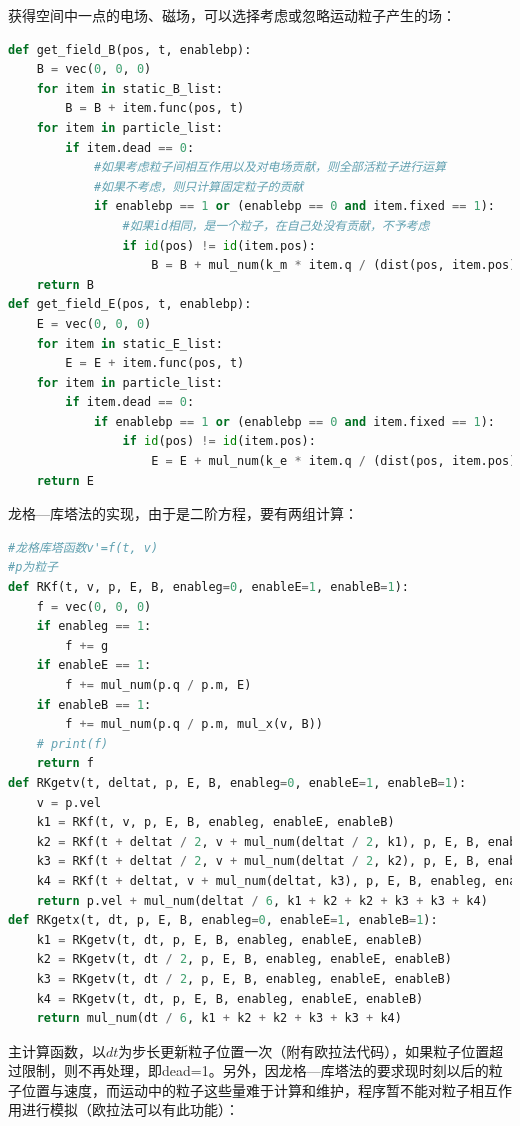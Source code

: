 \documentclass[UTF-8,cs4size]{ctexart}
\begin{document}
获得空间中一点的电场、磁场，可以选择考虑或忽略运动粒子产生的场：
\begin{lstlisting}[language=Python]
def get_field_B(pos, t, enablebp):
    B = vec(0, 0, 0)
    for item in static_B_list:
        B = B + item.func(pos, t)
    for item in particle_list:
        if item.dead == 0:
            #如果考虑粒子间相互作用以及对电场贡献，则全部活粒子进行运算
            #如果不考虑，则只计算固定粒子的贡献
            if enablebp == 1 or (enablebp == 0 and item.fixed == 1):
                #如果id相同，是一个粒子，在自己处没有贡献，不予考虑
                if id(pos) != id(item.pos):
                    B = B + mul_num(k_m * item.q / (dist(pos, item.pos) ** 3), mul_x(item.vel, (pos - item.pos)))
    return B
def get_field_E(pos, t, enablebp):
    E = vec(0, 0, 0)
    for item in static_E_list:
        E = E + item.func(pos, t)
    for item in particle_list:
        if item.dead == 0:
            if enablebp == 1 or (enablebp == 0 and item.fixed == 1):
                if id(pos) != id(item.pos):
                    E = E + mul_num(k_e * item.q / (dist(pos, item.pos) ** 3), pos - item.pos)
    return E
\end{lstlisting}
龙格—库塔法的实现，由于是二阶方程，要有两组计算：
\begin{lstlisting}[language=Python]
#龙格库塔函数v'=f(t, v)
#p为粒子
def RKf(t, v, p, E, B, enableg=0, enableE=1, enableB=1):
    f = vec(0, 0, 0)
    if enableg == 1:
        f += g
    if enableE == 1:
        f += mul_num(p.q / p.m, E)
    if enableB == 1:
        f += mul_num(p.q / p.m, mul_x(v, B))
    # print(f)
    return f
def RKgetv(t, deltat, p, E, B, enableg=0, enableE=1, enableB=1):
    v = p.vel
    k1 = RKf(t, v, p, E, B, enableg, enableE, enableB)
    k2 = RKf(t + deltat / 2, v + mul_num(deltat / 2, k1), p, E, B, enableg, enableE, enableB)
    k3 = RKf(t + deltat / 2, v + mul_num(deltat / 2, k2), p, E, B, enableg, enableE, enableB)
    k4 = RKf(t + deltat, v + mul_num(deltat, k3), p, E, B, enableg, enableE, enableB)
    return p.vel + mul_num(deltat / 6, k1 + k2 + k2 + k3 + k3 + k4)
def RKgetx(t, dt, p, E, B, enableg=0, enableE=1, enableB=1):
    k1 = RKgetv(t, dt, p, E, B, enableg, enableE, enableB)
    k2 = RKgetv(t, dt / 2, p, E, B, enableg, enableE, enableB)
    k3 = RKgetv(t, dt / 2, p, E, B, enableg, enableE, enableB)
    k4 = RKgetv(t, dt, p, E, B, enableg, enableE, enableB)
    return mul_num(dt / 6, k1 + k2 + k2 + k3 + k3 + k4)
\end{lstlisting}
主计算函数，以$dt$为步长更新粒子位置一次（附有欧拉法代码），如果粒子位置超过限制，则不再处理，即dead=1。另外，因龙格—库塔法的要求现时刻以后的粒子位置与速度，而运动中的粒子这些量难于计算和维护，程序暂不能对粒子相互作用进行模拟（欧拉法可以有此功能）：
\end{document}

